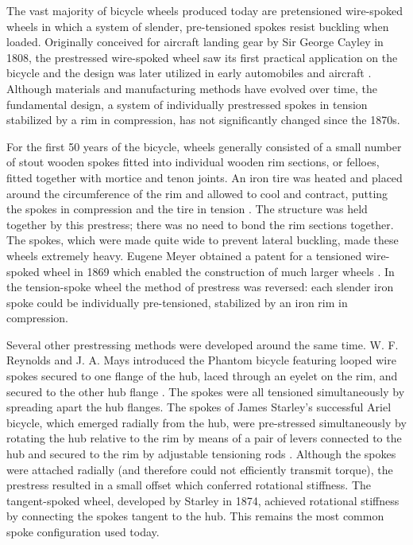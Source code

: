 \documentclass[../thesis.tex]{subfiles}
\begin{document}
The vast majority of bicycle wheels produced today are pretensioned wire-spoked wheels in which a system of slender, pre-tensioned spokes resist buckling when loaded. Originally conceived for aircraft landing gear by Sir George Cayley in 1808, the prestressed wire-spoked wheel saw its first practical application on the bicycle and the design was later utilized in early automobiles and aircraft \cite{Hadland2014}. Although materials and manufacturing methods have evolved over time, the fundamental design, a system of individually prestressed spokes in tension stabilized by a rim in compression, has not significantly changed since the 1870s.

For the first 50 years of the bicycle, wheels generally consisted of a small number of stout wooden spokes fitted into individual wooden rim sections, or felloes, fitted together with mortice and tenon joints. An iron tire was heated and placed around the circumference of the rim and allowed to cool and contract, putting the spokes in compression and the tire in tension \cite{Sharp1977}. The structure was held together by this prestress; there was no need to bond the rim sections together. The spokes, which were made quite wide to prevent lateral buckling, made these wheels extremely heavy. Eugene Meyer obtained a patent for a tensioned wire-spoked wheel in 1869 which enabled the construction of much larger wheels \cite{Clayton1991}. In the tension-spoke wheel the method of prestress was reversed: each slender iron spoke could be individually pre-tensioned, stabilized by an iron rim in compression.

Several other prestressing methods were developed around the same time. W. F. Reynolds and J. A. Mays introduced the Phantom bicycle featuring looped wire spokes secured to one flange of the hub, laced through an eyelet on the rim, and secured to the other hub flange \cite{Herlihy2004}. The spokes were all tensioned simultaneously by spreading apart the hub flanges. The spokes of James Starley's successful Ariel bicycle, which emerged radially from the hub, were pre-stressed simultaneously by rotating the hub relative to the rim by means of a pair of levers connected to the hub and secured to the rim by adjustable tensioning rods \cite{Caunter1955}. Although the spokes were attached radially (and therefore could not efficiently transmit torque), the prestress resulted in a small offset which conferred rotational stiffness. The tangent-spoked wheel, developed by Starley in 1874, achieved rotational stiffness by connecting the spokes tangent to the hub. This remains the most common spoke configuration used today.
\end{document}
